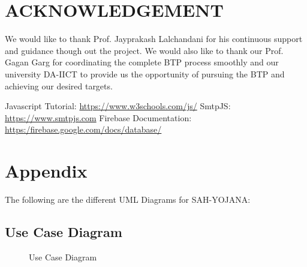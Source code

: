 \documentclass[conference]{IEEEtran}
\begin{document}
\section*{ACKNOWLEDGEMENT}

We would like to thank Prof. Jayprakash Lalchandani for his continuous support and guidance though out the project. We would also like to thank our Prof. Gagan Garg for coordinating the complete BTP process smoothly and our university DA-IICT to provide us the opportunity of pursuing the BTP and achieving our desired targets. 


\begin{thebibliography}{00}
 Javascript Tutorial:
\url{https://www.w3schools.com/js/}
 SmtpJS:
\url{https://www.smtpjs.com}
 Firebase Documentation:
\url{https:/firebase.google.com/docs/database/}


\end{thebibliography}
\vspace{12pt}
\newpage
\section*{Appendix}
The following are the different UML Diagrams for SAH-YOJANA:
\subsection{Use Case Diagram}
\begin{figure}[h!]
\centering
{}
\caption{Use Case Diagram}
\end{figure}
\newpage
\end{document}

